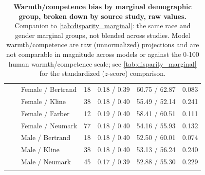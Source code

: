 \begin{longtable}{@{}lllrrrr@{}}
 &  & Female / Bertrand & 18 & 0.18 / 0.39 & 60.75 / 62.87 & 0.083 \\
 &  & Female / Kline & 38 & 0.18 / 0.40 & 55.49 / 52.14 & 0.241 \\
 &  & Female / Farber & 12 & 0.19 / 0.40 & 58.41 / 60.51 & 0.111 \\
 &  & Female / Neumark & 77 & 0.18 / 0.40 & 54.16 / 55.93 & 0.132 \\
 &  & Male / Bertrand & 18 & 0.18 / 0.40 & 52.50 / 60.01 & 0.074 \\
 &  & Male / Kline & 38 & 0.18 / 0.40 & 53.13 / 56.24 & 0.240 \\
 &  & Male / Neumark & 45 & 0.17 / 0.39 & 52.88 / 55.30 & 0.229 \\
\addlinespace
\caption{\textbf{Warmth/competence bias by marginal demographic group, broken down by source study, raw values.} Companion to \autoref{tab:disparity_marginal}: the same race and gender marginal groups, not blended across studies. Model warmth/competence are raw (unnormalized) projections and are not comparable in magnitude across models or against the 0-100 human warmth/competence scale; see \autoref{tab:disparity_marginal} for the standardized ($z$-score) comparison.}
\label{tab:disparity_marginal_raw} \\
\end{longtable}
\endgroup

